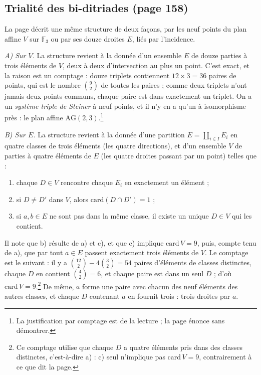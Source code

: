 \documentclass[11pt,a4paper]{article}
\begin{document}
\subsection*{Trialité des bi-ditriades (page 158)}

La page décrit une même structure de deux façons, par les neuf points du plan
affine $V$ sur $\mathbb{F}_3$ ou par ses douze droites $E$, liés par
l'incidence.

\emph{A) Sur $V$.} La structure revient à la donnée d'un ensemble $E$ de
douze parties à trois éléments de $V$, deux à deux d'intersection au plus un
point. C'est exact, et la raison est un comptage : douze triplets contiennent
$12 \times 3 = 36$ paires de points, qui est le nombre $\binom{9}{2}$ de toutes
les paires ; comme deux triplets n'ont jamais deux points communs, chaque paire
est dans exactement un triplet. On a un \emph{système triple de Steiner} à
neuf points, et il n'y en a qu'un à isomorphisme près : le plan affine
$\mathrm{AG}(2, 3)$.\footnote{La justification par comptage est de la
lecture ; la page énonce sans démontrer.}

\emph{B) Sur $E$.} La structure revient à la donnée d'une partition
$E = \coprod_{i \in I} E_i$ en quatre classes de trois éléments (les quatre
directions), et d'un ensemble $V$ de parties à quatre éléments de $E$ (les
quatre droites passant par un point) telles que :
\begin{enumerate}
  \item[a)] chaque $D \in V$ rencontre chaque $E_i$ en exactement un élément ;
  \item[b)] si $D \neq D'$ dans $V$, alors $\mathrm{card}(D \cap D') = 1$ ;
  \item[c)] si $a, b \in E$ ne sont pas dans la même classe, il existe un
    unique $D \in V$ qui les contient.
\end{enumerate}
Il note que b) résulte de a) et c), et que c) implique $\mathrm{card}\,V = 9$,
puis, compte tenu de a), que par tout $a \in E$ passent exactement trois
éléments de $V$. Le comptage est le suivant : il y a
$\binom{12}{2} - 4\binom{3}{2} = 54$ paires d'éléments de classes distinctes,
chaque $D$ en contient $\binom{4}{2} = 6$, et chaque paire est dans un seul
$D$ ; d'où $\mathrm{card}\,V = 9$.\footnote{Ce comptage utilise que chaque
$D$ a quatre éléments pris dans des classes distinctes, c'est-à-dire a) :
c) seul n'implique pas $\mathrm{card}\,V = 9$, contrairement à ce que dit la
page.} De même, $a$ forme une paire avec chacun des neuf éléments des autres
classes, et chaque $D$ contenant $a$ en fournit trois : trois droites
par $a$.
\end{document}
